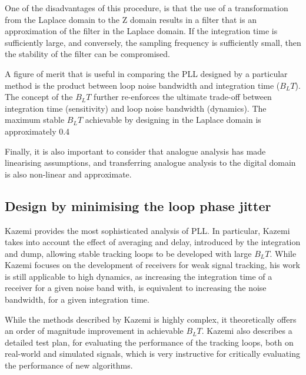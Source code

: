 One of the disadvantages of this procedure, is that the use of a transformation from the Laplace domain to the Z domain results in a filter that is an approximation of the filter in the Laplace domain. If the integration time is sufficiently large, and conversely, the sampling frequency is sufficiently small, then the stability of the filter can be compromised. 

A figure of merit that is useful in comparing the \ac{PLL} designed by a particular method is the product between loop noise bandwidth and integration time ($B_LT$). The concept of the $B_LT$ further re-enforces the ultimate trade-off between integration time (sensitivity) and loop noise bandwidth (dynamics). The maximum stable $B_LT$ achievable by designing in the Laplace domain is approximately 0.4 \cite{Kazemi2008,KazemiPHD}

Finally, it is also important to consider that analogue analysis has made linearising assumptions, and transferring analogue analysis to the digital domain is also non-linear and approximate\cite{Dempster}. 

\subsection{Design by minimising the loop phase jitter}

Kazemi\cite{KazemiPHD,Kazemi2008} provides the most sophisticated analysis of \ac{PLL}. In particular, Kazemi takes into account the effect of averaging and delay, introduced by the integration and dump, allowing stable tracking loops to be developed with large $B_LT$. While Kazemi focuses on the development of receivers for weak signal tracking, his work is still applicable to high dynamics, as increasing the integration time of a receiver for a given noise band with, is equivalent to increasing the noise bandwidth, for a given integration time. 

While the methods described by Kazemi is highly complex, it theoretically offers an order of magnitude improvement in achievable $B_LT$. Kazemi also describes a detailed test plan, for evaluating the performance of the tracking loops, both on real-world and simulated signals, which is very instructive for critically evaluating the performance of new algorithms.
